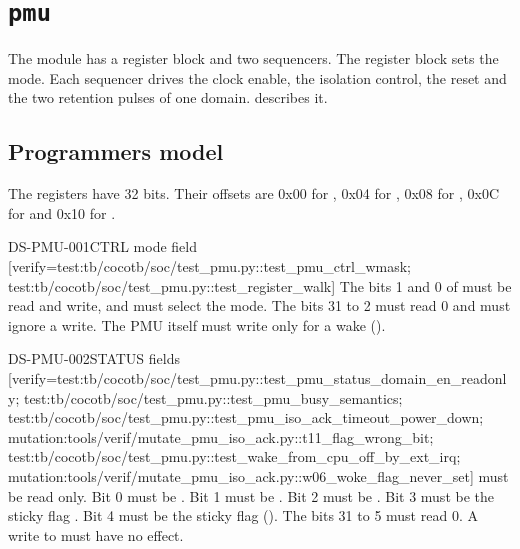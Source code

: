\section{\texttt{pmu}}\label{ds:mod:pmu}
The module  has a register block and two sequencers. The register block sets the mode. Each sequencer drives the clock enable, the isolation control, the reset and the two retention pulses of one domain.  describes it.

\subsection{Programmers model}\label{ds:mod:pmu:registers}
The registers have 32 bits. Their offsets are 0x00 for , 0x04 for , 0x08 for , 0x0C for  and 0x10 for .

\begin{requirement}{DS-PMU-001}{CTRL mode field}
[verify={test:tb/cocotb/soc/test_pmu.py::test_pmu_ctrl_wmask; test:tb/cocotb/soc/test_pmu.py::test_register_walk}]
The bits 1 and 0 of  must be read and write, and must select the mode. The bits 31 to 2 must read 0 and must ignore a write. The PMU itself must write  only for a wake ().
\end{requirement}

\begin{requirement}{DS-PMU-002}{STATUS fields}
[verify={test:tb/cocotb/soc/test_pmu.py::test_pmu_status_domain_en_readonly; test:tb/cocotb/soc/test_pmu.py::test_pmu_busy_semantics; test:tb/cocotb/soc/test_pmu.py::test_pmu_iso_ack_timeout_power_down; mutation:tools/verif/mutate_pmu_iso_ack.py::t11_flag_wrong_bit; test:tb/cocotb/soc/test_pmu.py::test_wake_from_cpu_off_by_ext_irq; mutation:tools/verif/mutate_pmu_iso_ack.py::w06_woke_flag_never_set}]
 must be read only. Bit 0 must be . Bit 1 must be . Bit 2 must be . Bit 3 must be the sticky flag . Bit 4 must be the sticky flag  (). The bits 31 to 5 must read 0. A write to  must have no effect.
\end{requirement}

